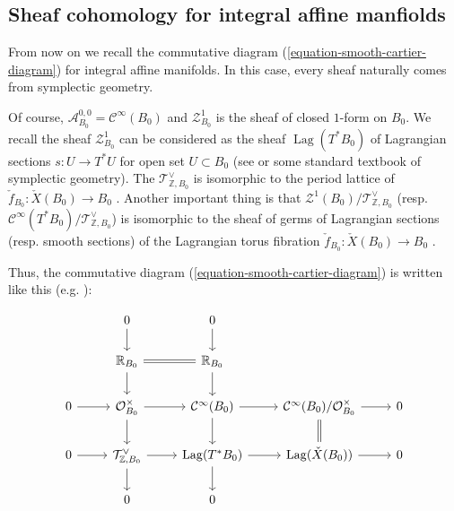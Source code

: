 \documentclass[a4paper,dvipdfmx,reqno,12pt]{amsart}
\theoremstyle{definition}
\newcommand{\Z}{\mathbb{Z}}%
\newcommand{\mb}[1]{\mathbb{#1}}%
\newcommand{\mcal}[1]{\mathcal{#1}}%
\newcommand{\opn}[1]{\operatorname{#1}}
\numberwithin{equation}{section}
\begin{document}
\subsection{Sheaf cohomology for integral affine manfiolds}

From now on we recall the commutative diagram (\ref{equation-smooth-cartier-diagram})
 for integral affine manifolds.
In this case, every sheaf naturally comes 
from symplectic geometry.

Of course, 
$\mcal{A}_{B_0}^{0,0}=\mcal{C}^{\infty}(B_0)$ and
$\mcal{Z}^{1}_{B_0}$ is the sheaf of 
closed $1$-form on $B_0$.
We recall the sheaf $\mcal{Z}^{1}_{B_0}$ can be 
considered as the sheaf 
$\opn{Lag}(T^{*}B_0)$ of Lagrangian sections 
$s:U \to T^{*}U$ for open set $U \subset B_0$ 
(see \cite[3.2]{MR1853077} or some standard textbook
of symplectic geometry).
The $\mcal{T}_{\Z,B_0}^{\vee}$ is isomorphic to
the period lattice of 
$\check{f}_{B_0}\colon \check{X}(B_0)\to B_0$ 
 \cite{duistermaatGlobalActionangleCoordinates1980a}.
Another important thing is that 
$\mcal{Z}^{1}(B_0)/\mcal{T}_{\Z,B_0}^{\vee}$
 (resp. $\mcal{C}^{\infty}(T^{*}B_0)/\mcal{T}_{\Z,B_0}^{\vee}$) 
is isomorphic to the sheaf of germs of Lagrangian sections 
(resp. smooth sections) of the Lagrangian torus fibration 
$\check{f}_{B_0}\colon \check{X}(B_0)\to B_0$ 
\cite[(2.7), (2.11)]{duistermaatGlobalActionangleCoordinates1980a}.


Thus, the commutative diagram (\ref{equation-smooth-cartier-diagram}) is written like this 
(e.g. \cite[p.468]{MR2567952}):

\begin{equation} \label{equation-cartier-lagrangian}
  \begin{tikzcd}
    & 0 \arrow[d]    & 0 \arrow[d]           &                      &   \\
    & \mb{R}_{B_0} \arrow[r,equal] \arrow[d]                & \mb{R}_{B_0} \arrow[d]           &                      &   \\
    0 \arrow[r] & \mathcal{O}_{B_0}^{\times} \arrow[r] \arrow[d]         & \mcal{C}^{\infty}(B_0) \arrow[r] \arrow[d] & \mcal{C}^{\infty}(B_0)/\mathcal{O}_{B_0}^{\times}  \arrow[r] \arrow[d,equal] & 0 \\
    0 \arrow[r] & \mcal{T}_{\Z,B_0}^{\vee} \arrow[r] \arrow[d] & \opn{Lag}(T^{*}B_0) \arrow[r] \arrow[d]  & \opn{Lag}(\check{X}(B_0)) \arrow[r]   & 0 \\
    & 0 & 0 &  &
  \end{tikzcd}
\end{equation}
\end{document}
